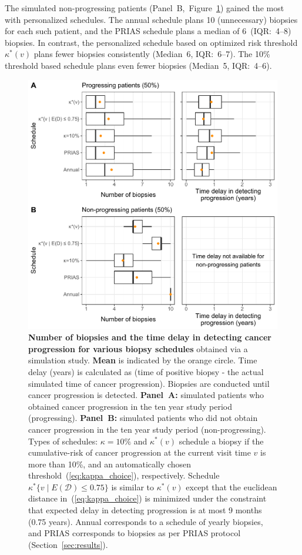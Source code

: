 The simulated non-progressing patients (Panel~B,~Figure~\ref{fig:simulation_boxplot}) gained the most with personalized schedules. The annual schedule plans 10 (unnecessary) biopsies for each such patient, and the PRIAS schedule plans a median of 6~(IQR:~4--8) biopsies. In contrast, the personalized schedule based on optimized risk threshold $\kappa^*(v)$ plans fewer biopsies consistently (Median~6, IQR:~6--7). The 10\% threshold based schedule plans even fewer biopsies (Median~5, IQR:~4--6).

\begin{figure}
\centerline{\includegraphics{images/simulation_boxplot.pdf}}
\caption{\small{\textbf{Number of biopsies and the time delay in detecting cancer progression for various biopsy schedules} obtained via a simulation study. \textbf{Mean} is indicated by the orange circle. Time delay (years) is calculated as (time of positive biopsy - the actual simulated time of cancer progression). Biopsies are conducted until cancer progression is detected. \textbf{Panel~A:} simulated patients who obtained cancer progression in the ten year study period (progressing). \textbf{Panel~B:} simulated patients who did not obtain cancer progression in the ten year study period (non-progressing). Types of schedules: ${\kappa=10\%}$ and $\kappa^*(v)$ schedule a biopsy if the cumulative-risk of cancer progression at the current visit time $v$ is more than 10\%, and an automatically chosen threshold~(\ref{eq:kappa_choice}), respectively. Schedule ${\kappa^*\{v \mid E(\mathcal{D})\leq 0.75\}}$ is similar to $\kappa^*(v)$ except that the euclidean distance in~(\ref{eq:kappa_choice}) is minimized under the constraint that expected delay in detecting progression is at most 9 months (0.75 years). Annual corresponds to a schedule of yearly biopsies, and PRIAS corresponds to biopsies as per PRIAS protocol (Section~\ref{sec:results}).}}
\label{fig:simulation_boxplot}
\end{figure}
